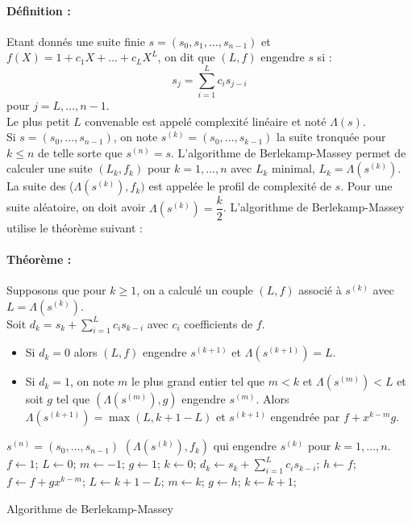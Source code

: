\documentclass[12pt,a4paper]{report}
\begin{document}
\paragraph{Définition :\\}
Etant donnés une suite finie $s=(s_0,s_1,\ldots,s_{n-1})$ et $f(X)=1+c_1X+\ldots +c_LX^L$, on dit que $(L,f)$ engendre $s$ si :
$$ s_j = \sum_{i=1}^L c_i s_{j-i} $$ pour $j=L,\ldots,n-1$.\\
Le plus petit $L$ convenable est appelé complexité linéaire et noté $\Lambda(s)$.\\
Si $s=(s_0,\ldots,s_{n-1})$, on note $s^{(k)}=(s_0,\ldots,s_{k-1})$ la suite tronquée pour $k \leqslant n$ de telle sorte que $s^{(n)} = s$. L'algorithme de Berlekamp-Massey permet de calculer une suite $(L_k,f_k)$ pour $k=1,\ldots, n$ avec $ L_k $ minimal, $L_k=\Lambda(s^{(k)})$. La suite des ($\Lambda(s^{(k)}), f_k)$ est appelée le profil de complexité de $s$. Pour une suite aléatoire, on doit avoir $\Lambda(s^{(k)})=\dfrac{k}{2}$. L'algorithme de Berlekamp-Massey utilise le théorème suivant :
\paragraph{Théorème :\\}
Supposons que pour $k \geqslant 1$, on a calculé un couple $(L,f)$ associé à $s^{(k)}$ avec $ L= \Lambda(s^{(k)})$.\\
Soit $d_k = s_k + \displaystyle \sum_{i=1}^L c_i s_{k-i} $ avec $c_i$ coefficients de $f$.
\begin{itemize}
\item Si $d_k= 0$ alors $(L,f)$ engendre $s^{(k+1)}$ et $\Lambda(s^{(k+1)}) = L$.
\item Si $d_k = 1$, on note $m$ le plus grand entier tel que $m<k$ et $\Lambda(s^{(m)})<L$ et soit $g$ tel que $(\Lambda(s^{(m)}),g)$ engendre $s^{(m)}$. Alors $ \Lambda(s^{(k+1)} )= \max(L,k+1-L)$ et $s^{(k+1)}$ engendrée par $ f + x^{k-m}g$.
\end{itemize}
\begin{algorithm}
\begin{algorithmic}[h]
\REQUIRE $s^{(n)}=(s_0,\ldots,s_{n-1})$
\ENSURE $(\Lambda(s^{(k)}),f_k)$ qui engendre $s^{(k)}$ pour $k=1, \ldots,n$.
\STATE $f \leftarrow 1$; $L \leftarrow 0$; $m \leftarrow -1$; $ g \leftarrow 1$; $k \leftarrow 0$;
\STATE $d_k \leftarrow s_k + \displaystyle \sum_{i=1}^L c_i s_{k-i} $;
\STATE $ h \leftarrow f$; $ f \leftarrow f + g x^{k-m}$;
\STATE $ L \leftarrow k+1-L$;
\STATE $ m\leftarrow k$;
\STATE $ g \leftarrow h$;
\ENDIF
\ENDIF
\STATE $k \leftarrow k+1$;
\ENDWHILE
\end{algorithmic}
\caption{Algorithme de Berlekamp-Massey}
\end{algorithm}
\end{document}
